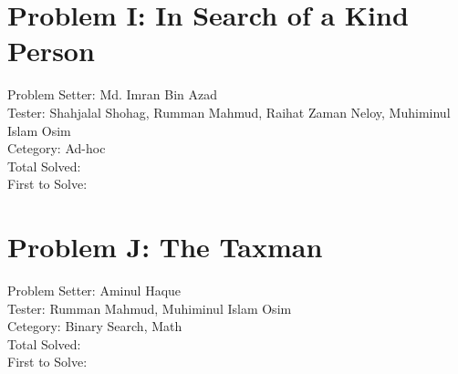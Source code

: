 \documentclass[11pt,a4paper]{article}
\begin{document}
\section*{Problem I: In Search of a Kind Person}
Problem Setter: Md. Imran Bin Azad \\
Tester: Shahjalal Shohag, Rumman Mahmud, Raihat Zaman Neloy, Muhiminul Islam Osim \\
Cetegory: Ad-hoc \\
Total Solved:  \\
First to Solve: \\

\section*{Problem J: The Taxman}
Problem Setter: Aminul Haque \\
Tester: Rumman Mahmud,  Muhiminul Islam Osim \\
Cetegory: Binary Search, Math \\
Total Solved:  \\
First to Solve: \\
\end{document}
